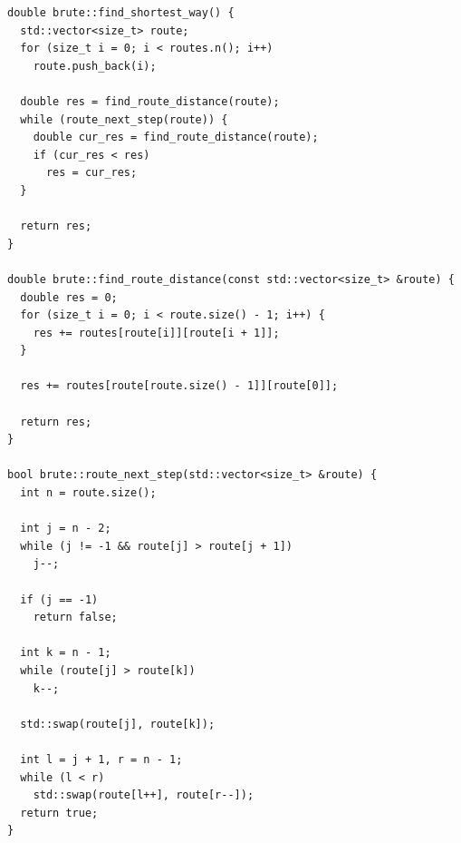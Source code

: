 \documentclass[12pt]{report}
\begin{document}
\begin{lstlisting}[label=some-code,caption=Алгоритм полного перебора]
double brute::find_shortest_way() {
  std::vector<size_t> route;
  for (size_t i = 0; i < routes.n(); i++)
    route.push_back(i);

  double res = find_route_distance(route);
  while (route_next_step(route)) {
    double cur_res = find_route_distance(route);
    if (cur_res < res)
      res = cur_res;
  }

  return res;
}

double brute::find_route_distance(const std::vector<size_t> &route) {
  double res = 0;
  for (size_t i = 0; i < route.size() - 1; i++) {
    res += routes[route[i]][route[i + 1]];
  }

  res += routes[route[route.size() - 1]][route[0]];

  return res;
}

bool brute::route_next_step(std::vector<size_t> &route) {
  int n = route.size();

  int j = n - 2;
  while (j != -1 && route[j] > route[j + 1])
    j--;

  if (j == -1)
    return false; 

  int k = n - 1;
  while (route[j] > route[k])
    k--;

  std::swap(route[j], route[k]);

  int l = j + 1, r = n - 1; 
  while (l < r)
    std::swap(route[l++], route[r--]);
  return true;
}

\end{lstlisting}
	
\end{document}
